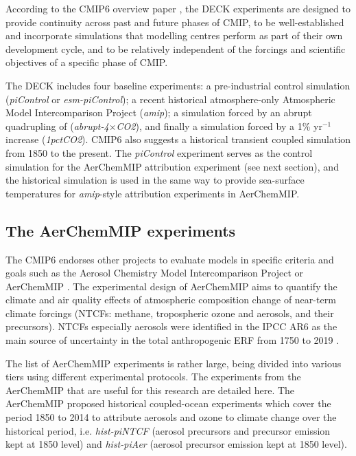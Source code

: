 According to the CMIP6 overview paper \citep{eyringOverviewCoupledModel2016}, the DECK experiments are designed to provide continuity across past and future phases of CMIP, to be well-established and incorporate simulations that modelling centres perform as part of their own development cycle, and to be relatively independent of the forcings and scientific objectives of a specific phase of CMIP. 

The DECK includes four baseline experiments: a pre-industrial control simulation (\textit{piControl} or \textit{esm-piControl}); a recent historical atmosphere-only Atmospheric Model Intercomparison Project (\textit{amip}); a simulation forced by an abrupt quadrupling of  (\textit{abrupt-4$\times$CO2}), and finally a simulation forced by a 1\% yr$^{-1}$  increase (\textit{1pctCO2}). CMIP6 also suggests a historical transient coupled simulation from 1850 to the present.  The \textit{piControl} experiment serves as the control simulation for the AerChemMIP attribution experiment (see next section), and the historical simulation is used in the same way to provide sea-surface temperatures for \textit{amip}-style attribution experiments in AerChemMIP.

\subsection{The AerChemMIP experiments}

The CMIP6 endorses other projects to evaluate models in specific criteria and goals such as the Aerosol Chemistry Model Intercomparison Project or AerChemMIP \citep{collinsAerChemMIPQuantifyingEffects2017}. The experimental design of AerChemMIP aims to quantify the climate and air quality effects of atmospheric composition change of near-term climate forcings (NTCFs: methane, tropospheric ozone and aerosols, and their precursors). NTCFs especially aerosols were identified in the IPCC AR6 as the main source of uncertainty in the total anthropogenic ERF from 1750 to 2019 \citep[see figure \ref{fig:1.ERF} and][]{forsterEarthEnergyBudget2021}.

The list of AerChemMIP experiments is rather large, being divided into various tiers using different experimental protocols. The experiments from the AerChemMIP that are useful for this research are detailed here. The AerChemMIP proposed historical coupled-ocean experiments which cover the period 1850 to 2014 to attribute aerosols and ozone to climate change over the historical period, i.e. \textit{hist-piNTCF} (aerosol precursors and  precursor emission kept at 1850 level) and \textit{hist-piAer} (aerosol precursor emission kept at 1850 level). 

